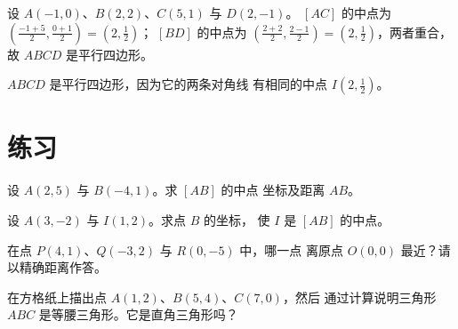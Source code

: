 \begin{example}\label{ex:g10:coordgeom:parallelogram}
设 $A(-1, 0)$、$B(2, 2)$、$C(5, 1)$ 与 $D(2, -1)$。
$[AC]$ 的中点为 $\left(\frac{-1+5}{2}, \frac{0+1}{2}\right) = (2, \frac12)$；
$[BD]$ 的中点为 $\left(\frac{2+2}{2}, \frac{2-1}{2}\right) =
(2, \frac12)$，两者重合，故 $ABCD$ 是平行四边形。
\end{example}

\begin{omfigure}

{\small $ABCD$ 是平行四边形，因为它的两条对角线
有相同的中点 $I(2, \frac12)$。}
\end{omfigure}

\section{练习}

\begin{exercise}[$\star$]\label{exo:g10:coordgeom:1}
设 $A(2, 5)$ 与 $B(-4, 1)$。求 $[AB]$ 的中点
坐标及距离 $AB$。
\end{exercise}

\begin{exercise}[$\star$]\label{exo:g10:coordgeom:2}
设 $A(3, -2)$ 与 $I(1, 2)$。求点 $B$ 的坐标，
使 $I$ 是 $[AB]$ 的中点。
\end{exercise}

\begin{exercise}[$\star$]\label{exo:g10:coordgeom:3}
在点 $P(4, 1)$、$Q(-3, 2)$ 与 $R(0, -5)$ 中，哪一点
离原点 $O(0,0)$ 最近？请以精确距离作答。
\end{exercise}

\begin{exercise}[$\star$]\label{exo:g10:coordgeom:4}
在方格纸上描出点 $A(1, 2)$、$B(5, 4)$、$C(7, 0)$，然后
通过计算说明三角形 $ABC$ 是等腰三角形。它是直角三角形吗？
\end{exercise}


